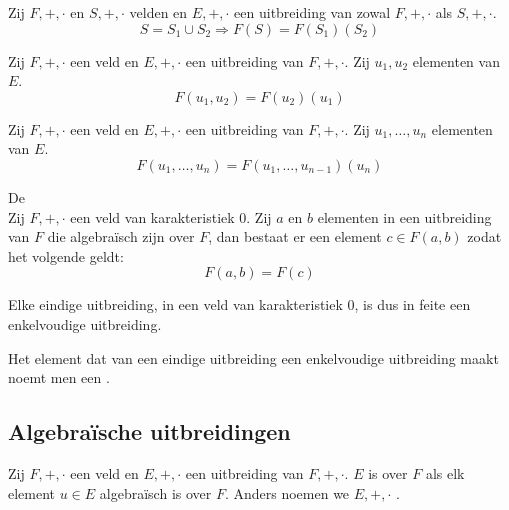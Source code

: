 \documentclass[main.tex]{subfiles}
\begin{document}
\begin{st}
  Zij $F,+,\cdot$ en $S,+,\cdot$ velden en $E,+,\cdot$ een uitbreiding van zowal $F,+,\cdot$ als $S,+,\cdot$.
  \[ S = S_{1} \cup S_{2} \Rightarrow F(S) = F(S_{1})(S_{2}) \]
\end{st}

\begin{st}
  \label{st:rekenregel-uitbreidingen-basis}
  Zij $F,+,\cdot$ een veld en $E,+,\cdot$ een uitbreiding van $F,+,\cdot$.
  Zij $u_{1},u_{2}$ elementen van $E$.
  \[ F(u_{1},u_{2}) = F(u_{2})(u_{1})\]
\end{st}

\begin{st}
  \label{st:rekenregel-uitbreidingen}
  Zij $F,+,\cdot$ een veld en $E,+,\cdot$ een uitbreiding van $F,+,\cdot$.
  Zij $u_{1},\dotsc,u_{n}$ elementen van $E$.
  \[ F(u_{1},\dotsc,u_{n}) = F(u_{1},\dotsc,u_{n-1})(u_{n})\]
\end{st}

\begin{st}
  De \\
  Zij $F,+,\cdot$ een veld van karakteristiek $0$.
  Zij $a$ en $b$ elementen in een uitbreiding van $F$ die algebra\"isch zijn over $F$,
  dan bestaat er een element $c\in F(a,b)$ zodat het volgende geldt:
  \[ F(a,b) = F(c) \]
  \zb
\end{st}

\begin{opm}
  Elke eindige uitbreiding, in een veld van karakteristiek $0$, is dus in feite een enkelvoudige uitbreiding.
\end{opm}

\begin{de}
  Het element dat van een eindige uitbreiding een enkelvoudige uitbreiding maakt noemt men een .
\end{de}

\subsection{Algebra\"ische uitbreidingen}
\label{sec:algebr-uitbr}
\begin{de}
  Zij $F,+,\cdot$ een veld en $E,+,\cdot$ een uitbreiding van $F,+,\cdot$.
  $E$ is  over $F$ als elk element $u\in E$ algebra\"isch is over $F$.
  Anders noemen we $E,+,\cdot$ .
\end{de}
\end{document}
